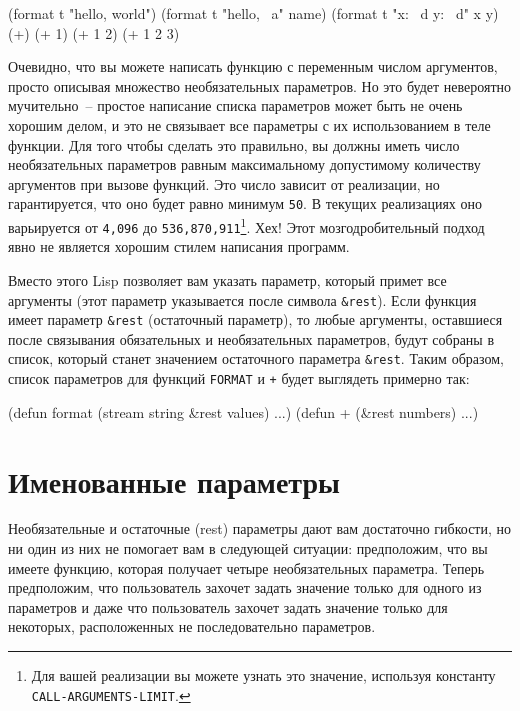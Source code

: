 \begin{myverb}
(format t "hello, world")
(format t "hello, ~a" name)
(format t "x: ~d y: ~d" x y)
(+)
(+ 1)
(+ 1 2)
(+ 1 2 3)
\end{myverb}

Очевидно, что вы можете написать функцию с переменным числом аргументов, просто описывая
множество необязательных параметров.  Но это будет невероятно мучительно~-- простое
написание списка параметров может быть не очень хорошим делом, и это не связывает все
параметры с их использованием в теле функции.  Для того чтобы сделать это правильно, вы
должны иметь число необязательных параметров равным максимальному допустимому количеству
аргументов при вызове функций.  Это число зависит от реализации, но гарантируется, что оно
будет равно минимум \lstinline{50}.  В текущих реализациях оно варьируется от \lstinline{4,096} до
\lstinline{536,870,911}\footnote{Для вашей реализации вы можете узнать это значение, используя
  константу \lstinline{CALL-ARGUMENTS-LIMIT}.}.  Хех!  Этот мозгодробительный подход явно не
является хорошим стилем написания программ.

Вместо этого Lisp позволяет вам указать параметр, который примет все аргументы (этот
параметр указывается после символа \lstinline!&rest!).  Если функция имеет параметр
\lstinline!&rest! (остаточный параметр), то любые аргументы, оставшиеся после связывания
обязательных и необязательных параметров, будут собраны в список, который станет значением
остаточного параметра \lstinline!&rest!.  Таким образом, список параметров для функций
\lstinline{FORMAT} и \lstinline{+} будет выглядеть примерно так:

\begin{myverb}
(defun format (stream string &rest values) ...)
(defun + (&rest numbers) ...) 
\end{myverb}

\section{Именованные параметры}

Необязательные и остаточные (rest) параметры дают вам достаточно гибкости, но ни один из
них не помогает вам в следующей ситуации: предположим, что вы имеете функцию, которая
получает четыре необязательных параметра.  Теперь предположим, что пользователь захочет
задать значение только для одного из параметров и даже что пользователь захочет задать
значение только для некоторых, расположенных не последовательно параметров.


